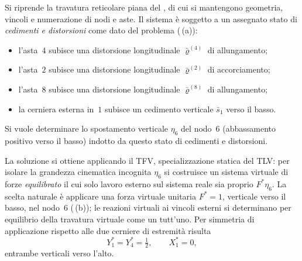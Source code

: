 \begin{esempio}
	\label{subsec:TFV_reticolare}
	
	Si riprende la travatura reticolare piana del
	, di cui si mantengono geometria,
	vincoli e numerazione di nodi e aste. Il sistema è soggetto a un
	assegnato stato di \emph{cedimenti e distorsioni} come dato del
	problema (\,(a)):
	\begin{itemize}[noitemsep,topsep=2pt]
		\item l'asta~$4$ subisce una distorsione longitudinale
		$\bar\varrho^{(4)}$ di allungamento;
		\item l'asta~$2$ subisce una distorsione longitudinale
		$\bar\varrho^{(2)}$ di accorciamento;
		\item l'asta~$8$ subisce una distorsione longitudinale
		$\bar\varrho^{(8)}$ di allungamento;
		\item la cerniera esterna in~$1$ subisce un cedimento verticale
		$\bar s_1$ verso il basso.
	\end{itemize}
	Si vuole determinare lo spostamento verticale $\eta_6$ del nodo~$6$
	(abbassamento positivo verso il basso) indotto da questo stato di
	cedimenti e distorsioni.
	
	\begin{svolgimento}
		
		La soluzione si ottiene applicando il TFV, specializzazione statica
		del TLV: per isolare la grandezza cinematica incognita $\eta_6$
		si costruisce un sistema virtuale di forze \emph{equilibrato} il cui
		solo lavoro esterno sul sistema reale sia proprio $F^{*}\eta_6$.
		La scelta naturale è applicare una forza virtuale unitaria
		$F^{*}=1$, verticale verso il basso, nel nodo~$6$
		(\,(b)); le reazioni virtuali ai vincoli
		esterni si determinano per equilibrio della travatura virtuale come
		un tutt'uno. Per simmetria di applicazione rispetto alle due cerniere
		di estremità risulta
		\begin{equation*}
			Y_1^{*} = Y_4^{*} = \tfrac{1}{2}, \qquad X_1^{*} = 0,
		\end{equation*}
		entrambe verticali verso l'alto.
		



		

\end{svolgimento}
\end{esempio}
